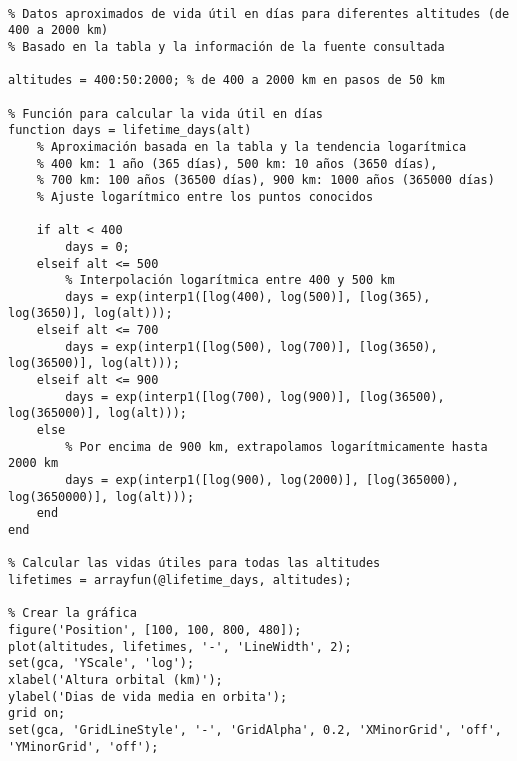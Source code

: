 \begin{verbatim}

% Datos aproximados de vida útil en días para diferentes altitudes (de 400 a 2000 km)
% Basado en la tabla y la información de la fuente consultada

altitudes = 400:50:2000; % de 400 a 2000 km en pasos de 50 km

% Función para calcular la vida útil en días
function days = lifetime_days(alt)
    % Aproximación basada en la tabla y la tendencia logarítmica
    % 400 km: 1 año (365 días), 500 km: 10 años (3650 días), 
    % 700 km: 100 años (36500 días), 900 km: 1000 años (365000 días)
    % Ajuste logarítmico entre los puntos conocidos
    
    if alt < 400
        days = 0;
    elseif alt <= 500
        % Interpolación logarítmica entre 400 y 500 km
        days = exp(interp1([log(400), log(500)], [log(365), log(3650)], log(alt)));
    elseif alt <= 700
        days = exp(interp1([log(500), log(700)], [log(3650), log(36500)], log(alt)));
    elseif alt <= 900
        days = exp(interp1([log(700), log(900)], [log(36500), log(365000)], log(alt)));
    else
        % Por encima de 900 km, extrapolamos logarítmicamente hasta 2000 km
        days = exp(interp1([log(900), log(2000)], [log(365000), log(3650000)], log(alt)));
    end
end

% Calcular las vidas útiles para todas las altitudes
lifetimes = arrayfun(@lifetime_days, altitudes);

% Crear la gráfica
figure('Position', [100, 100, 800, 480]);
plot(altitudes, lifetimes, '-', 'LineWidth', 2);
set(gca, 'YScale', 'log');
xlabel('Altura orbital (km)');
ylabel('Dias de vida media en orbita');
grid on;
set(gca, 'GridLineStyle', '-', 'GridAlpha', 0.2, 'XMinorGrid', 'off', 'YMinorGrid', 'off');


\end{verbatim}